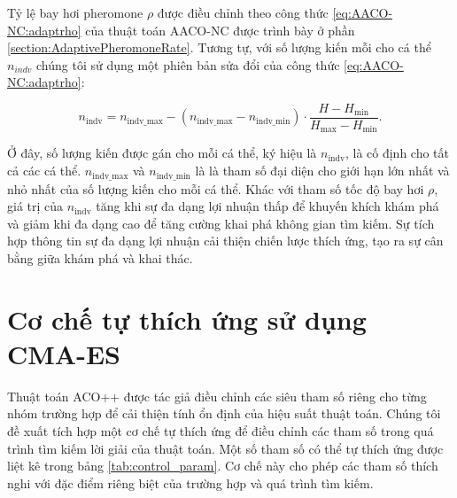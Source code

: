 Tỷ lệ bay hơi pheromone $\rho$ được điều chỉnh theo công thức \ref{eq:AACO-NC:adaptrho} của thuật toán AACO-NC được trình bày ở phần \ref{section:AdaptivePheromoneRate}. Tương tự, với số lượng kiến mỗi cho cá thể $n_{indv}$ chúng tôi sử dụng một phiên bản sửa đổi của công thức \ref{eq:AACO-NC:adaptrho}:

\begin{equation} \label{eq:adaptants}
    n_{\text{indv}} = n_{\text{indv\_max}} - (n_{\text{indv\_max}} - n_{\text{indv\_min}}) \cdot \frac{H - H_{\text{min}}}{H_{\text{max}} - H_{\text{min}}}.
\end{equation}

Ở đây, số lượng kiến được gán cho mỗi cá thể, ký hiệu là $n_{\text{indv}}$, là cố định cho tất cả các cá thể. $n_{\text{indv\_max}}$ và $n_{\text{indv\_min}}$ là là  tham số đại diện cho giới hạn lớn nhất và nhỏ nhất của số lượng kiến cho mỗi cá thể. Khác với tham số tốc độ bay hơi $\rho$, giá trị của $n_{\text{indv}}$ tăng khi sự đa dạng lợi nhuận thấp để khuyến khích khám phá và giảm khi đa dạng cao để tăng cường khai phá không gian tìm kiếm. Sự tích hợp thông tin sự đa dạng lợi nhuận cải thiện chiến lược thích ứng, tạo ra sự cân bằng giữa khám phá và khai thác.

\section{Cơ chế tự thích ứng sử dụng CMA-ES}\label{section:CMAES}

Thuật toán ACO++ được tác giả điều chỉnh các siêu tham số riêng cho từng nhóm trường hợp để cải thiện tính ổn định của hiệu suất thuật toán. Chúng tôi đề xuất tích hợp một cơ chế tự thích ứng để điều chỉnh các tham số trong quá trình tìm kiếm lời giải của thuật toán. Một số tham số có thể tự thích ứng được liệt kê trong bảng \ref{tab:control_param}. Cơ chế này cho phép các tham số thích nghi với đặc điểm riêng biệt của trường hợp và quá trình tìm kiếm.

